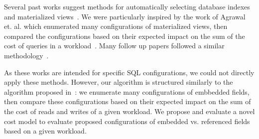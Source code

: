 Several past works suggest methods for automatically selecting database indexes and materialized views~\cite{Goldstein2001,Zilio2004,Gupta2005,Yang1997,Agrawal2000}. We were particularly inspired by the work of Agrawal et. al. which enumerated many configurations of materialized views, then compared the configurations based on their expected impact on the sum of the cost of queries in a workload~\cite{Agrawal2000}. Many follow up papers followed a similar methodology~\cite{Goldstein2001,Zilio2004,Gupta2005}.

As these works are intended for specific SQL configurations, we could not directly apply these methods. However, our algorithm is structured similarly to the algorithm proposed in~\cite{Agrawal2000}: we enumerate many configurations of embbedded fields, then compare these configurations based on their expected impact on the sum of the cost of reads and writes of a given workload. 
We propose and evaluate a novel cost model to evaluate proposed configurations of embedded vs. referenced fields based on a given workload. 

%
